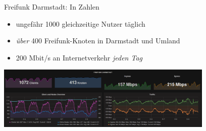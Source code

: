 \documentclass[10pt]{beamer}
\begin{document}
  \begin{frame}{Freifunk Darmstadt: In Zahlen}
    \begin{itemize}
	  \item ungefähr 1000 gleichzeitige Nutzer täglich
	  \item \emph{über} 400 Freifunk-Knoten in Darmstadt und Umland
	  \item 200 Mbit/s an Internetverkehr \emph{jeden Tag}
    \end{itemize}
    \begin{center}
      \includegraphics[height=3cm]{images/2016-05_grafana}
    \end{center}
  \end{frame}
  
\end{document}
